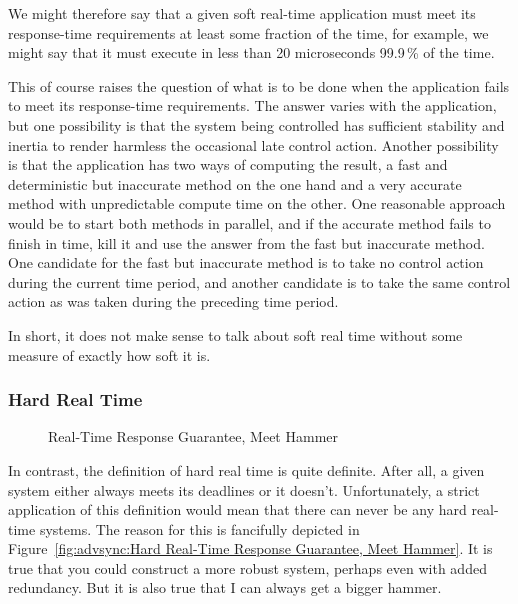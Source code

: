 We might therefore say that a given soft real-time application must meet
its response-time requirements at least some fraction of the time, for
example, we might say that it must execute in less than 20 microseconds
99.9\,\% of the time.

This of course raises the question of what is to be done when the application
fails to meet its response-time requirements.
The answer varies with the application, but one possibility
is that the system being controlled has sufficient stability and inertia
to render harmless the occasional late control action.
Another possibility is that the application has two ways of computing
the result, a fast and deterministic but inaccurate method on the
one hand and
a very accurate method with unpredictable compute time on the other.
One reasonable approach would be to start
both methods in parallel, and if the accurate method fails to finish
in time, kill it and use the answer from the fast but inaccurate method.
One candidate for the fast but inaccurate method is to take
no control action during the current time period, and another candidate is
to take the same control action as was taken during the preceding time
period.

In short, it does not make sense to talk about soft real time without
some measure of exactly how soft it is.

\subsubsection{Hard Real Time}
\label{sec:Hard Real Time}

\begin{figure}[bt]
\centering
{}
\caption{Real-Time Response Guarantee, Meet Hammer}
\end{figure}

In contrast, the definition of hard real time is quite definite.
After all, a given system either always meets its deadlines or it
doesn't.
Unfortunately, a strict application of this definition would mean that
there can never be any hard real-time systems.
The reason for this is fancifully depicted in
Figure~\ref{fig:advsync:Hard Real-Time Response Guarantee, Meet Hammer}.
It is true that you could construct a more robust system, perhaps even
with added redundancy.
But it is also true that I can always get a bigger hammer.


